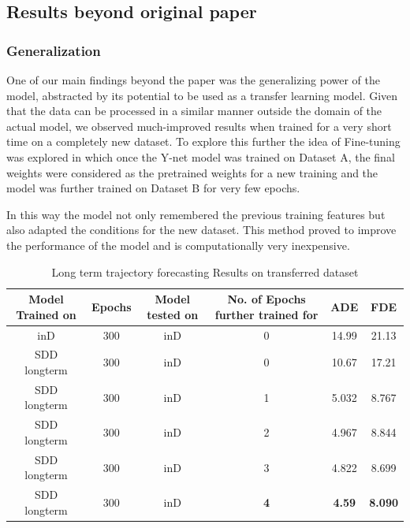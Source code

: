 \subsection{Results beyond original paper}

\subsubsection{Generalization}

One of our main findings beyond the paper was the generalizing power of the model, abstracted by its potential to be used as a transfer learning model. Given that the data can be processed in a similar manner outside the domain of the actual model, we observed much-improved results when trained for a very short time on a completely new dataset. To explore this further the idea of Fine-tuning was explored in which once the Y-net model was trained on Dataset A, the final weights were considered as the pretrained weights for a new training and the model was further trained on Dataset B for very few epochs.

In this way the model not only remembered the previous training features but also 
adapted the conditions for the new dataset. This method proved to improve the performance of the model and is computationally very inexpensive.
\begin{table}[H]
\vspace*{-.1in}
\begin{center}
\begin{tabular}{ |c|c|c|c|c|c| }
 \hline
 Model Trained on & Epochs & Model tested on & No. of Epochs further trained for & ADE & FDE\\ 
  \hline
  inD & 300 & inD & 0 & 14.99 & 21.13\\ 
 \hline
 SDD longterm & 300 & inD & 0 & 10.67 & 17.21\\ 
 \hline
 SDD longterm & 300 & inD & 1 & 5.032 & 8.767\\ 
 \hline
 SDD longterm & 300 & inD & 2 & 4.967 & 8.844\\ 
 \hline
 SDD longterm & 300 & inD & 3 & 4.822 & 8.699\\ 
 \hline
 SDD longterm & 300 & inD & \textbf{4} & \textbf{4.59} & \textbf{8.090}\\ 
 \hline
\end{tabular}
\bigskip
\caption{Long term trajectory forecasting Results on transferred dataset}
\label{eq:result_1}
\end{center}
\vspace*{-.1in}
\end{table}
